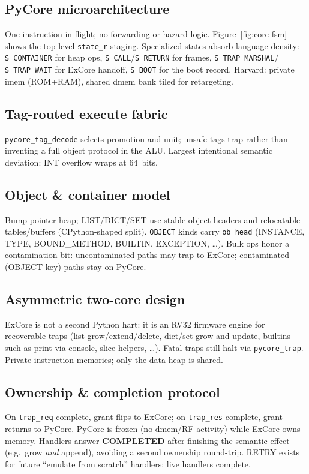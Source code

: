\documentclass[11pt,a4paper]{article}
\begin{document}
\subsection{PyCore microarchitecture}
One instruction in flight; no forwarding or hazard logic.
Figure~\ref{fig:core-fsm} shows the top-level \texttt{state\_r} staging.
Specialized states absorb language density: \texttt{S\_CONTAINER} for heap ops,
\texttt{S\_CALL}/\texttt{S\_RETURN} for frames, \texttt{S\_TRAP\_MARSHAL}/
\texttt{S\_TRAP\_WAIT} for ExCore handoff, \texttt{S\_BOOT} for the boot record.
Harvard: private imem (ROM+RAM), shared dmem bank tiled for retargeting.

\subsection{Tag-routed execute fabric}
\texttt{pycore\_tag\_decode} selects promotion and unit; unsafe tags trap rather
than inventing a full object protocol in the ALU.
Largest intentional semantic deviation: INT overflow wraps at 64~bits.

\subsection{Object \& container model}
Bump-pointer heap; LIST/DICT/SET use stable object headers and relocatable
tables/buffers (CPython-shaped split).
\texttt{OBJECT} kinds carry \texttt{ob\_head} (INSTANCE, TYPE, BOUND\_METHOD,
BUILTIN, EXCEPTION, \ldots).
Bulk ops honor a contamination bit: uncontaminated paths may trap to ExCore;
contaminated (OBJECT-key) paths stay on PyCore.

\subsection{Asymmetric two-core design}
ExCore is not a second Python hart: it is an RV32 firmware engine for
recoverable traps (list grow/extend/delete, dict/set grow and update, builtins
such as print via console, slice helpers, \ldots).
Fatal traps still halt via \texttt{pycore\_trap}.
Private instruction memories; only the data heap is shared.

\subsection{Ownership \& completion protocol}
On \texttt{trap\_req} complete, grant flips to ExCore; on \texttt{trap\_res}
complete, grant returns to PyCore.
PyCore is frozen (no dmem/RF activity) while ExCore owns memory.
Handlers answer \textbf{COMPLETED} after finishing the semantic effect
(e.g.\ grow \emph{and} append), avoiding a second ownership round-trip.
RETRY exists for future ``emulate from scratch'' handlers; live handlers
complete.
\end{document}
